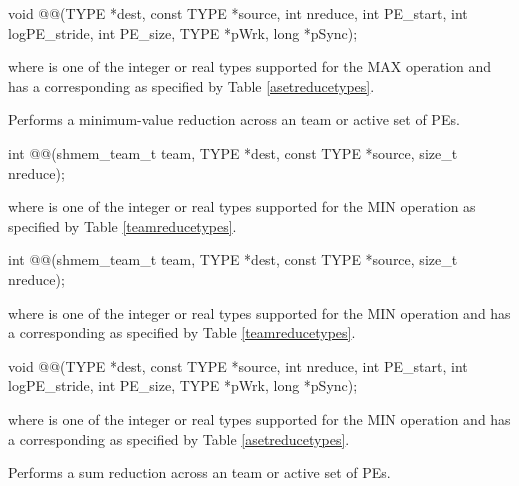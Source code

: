 \begin{apidefinition}
\begin{DeprecateBlock}
\begin{CsynopsisCol}
void @@(TYPE *dest, const TYPE *source, int nreduce, int PE_start, int logPE_stride, int PE_size, TYPE *pWrk, long *pSync);
\end{CsynopsisCol}
\end{DeprecateBlock}
where \TYPE{} is one of the integer or real types supported for the MAX operation and has a corresponding \TYPENAME{} as specified by Table \ref{asetreducetypes}.

\label{subsec:shmem_min_reduce}
Performs a minimum-value reduction across an \openshmem team or active set of \acp{PE}.\newline

\begin{C11synopsis}
int @@(shmem_team_t team, TYPE *dest, const TYPE *source, size_t nreduce);
\end{C11synopsis}
where \TYPE{} is one of the integer or real types supported for the MIN operation as specified by Table \ref{teamreducetypes}.

\begin{Csynopsis}
\end{Csynopsis}

\begin{CsynopsisCol}
int @@(shmem_team_t team, TYPE *dest, const TYPE *source, size_t nreduce);
\end{CsynopsisCol}
where \TYPE{} is one of the integer or real types supported for the MIN operation and has a corresponding \TYPENAME{} as specified by Table \ref{teamreducetypes}.

\begin{DeprecateBlock}
\begin{CsynopsisCol}
void @@(TYPE *dest, const TYPE *source, int nreduce, int PE_start, int logPE_stride, int PE_size, TYPE *pWrk, long *pSync);
\end{CsynopsisCol}
\end{DeprecateBlock}
where \TYPE{} is one of the integer or real types supported for the MIN operation and has a corresponding \TYPENAME{} as specified by Table \ref{asetreducetypes}.

\label{subsec:shmem_sum_reduce}
Performs a sum reduction across an \openshmem team or active set of \acp{PE}.\newline


\end{apidefinition}
